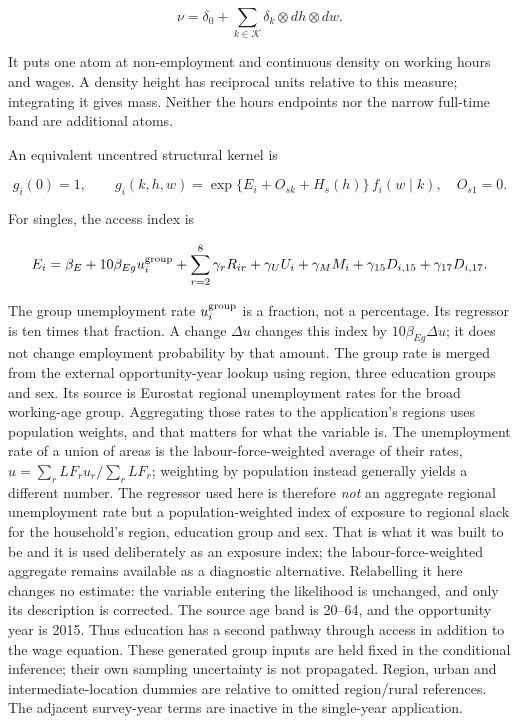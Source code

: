 \documentclass[11pt,a4paper]{article}
\begin{document}
\[\nu=\delta_0+\sum_{k\in\mathcal K}\delta_k\otimes dh\otimes dw.\]

It puts one atom at non-employment and continuous density on working hours and wages. A density height has reciprocal units relative to this measure; integrating it gives mass. Neither the hours endpoints nor the narrow full-time band are additional atoms.

An equivalent uncentred structural kernel is

\[g_i(0)=1,\qquad g_i(k,h,w)=\exp\{E_i+O_{sk}+H_s(h)\}\,f_i(w\mid k),\quad O_{s1}=0.\]

For singles, the access index is

\[E_i=\beta_E+10\beta_{Eg}u_i^{\rm group}+\sum_{r=2}^{8}\gamma_r R_{ir}
+\gamma_U U_i+\gamma_M M_i+\gamma_{15}D_{i,15}+\gamma_{17}D_{i,17}.\]

The group unemployment rate \(u_i^{\rm group}\) is a fraction, not a percentage. Its regressor is ten times that fraction. A change \(\Delta u\) changes this index by \(10\beta_{Eg}\Delta u\); it does not change employment probability by that amount. The group rate is merged from the external opportunity-year lookup using region, three education groups and sex. Its source is Eurostat regional unemployment rates for the broad working-age group. Aggregating those rates to the application's regions uses population weights, and that matters for what the variable is. The unemployment rate of a union of areas is the labour-force-weighted average of their rates, \(u=\sum_r LF_r u_r/\sum_r LF_r\); weighting by population instead generally yields a different number. The regressor used here is therefore \emph{not} an aggregate regional unemployment rate but a population-weighted index of exposure to regional slack for the household's region, education group and sex. That is what it was built to be and it is used deliberately as an exposure index; the labour-force-weighted aggregate remains available as a diagnostic alternative. Relabelling it here changes no estimate: the variable entering the likelihood is unchanged, and only its description is corrected. The source age band is 20--64, and the opportunity year is 2015. Thus education has a second pathway through access in addition to the wage equation. These generated group inputs are held fixed in the conditional inference; their own sampling uncertainty is not propagated. Region, urban and intermediate-location dummies are relative to omitted region/rural references. The adjacent survey-year terms are inactive in the single-year application.
\end{document}
